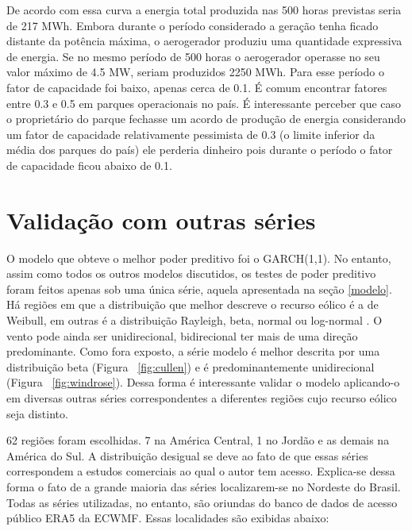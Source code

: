 \documentclass[
	12pt,				%
	openright,			%
	oneside,			%
	a4paper,			%
	english,			%
	french,				%
	spanish,			%
	brazil				%
	]{abntex2}
\begin{document}
De acordo com essa curva a energia total produzida nas 500 horas previstas seria de 217 MWh. Embora durante o período considerado a geração tenha ficado distante da potência máxima, o aerogerador produziu uma quantidade expressiva de energia. Se no mesmo período de 500 horas o aerogerador operasse no seu valor máximo de 4.5 MW, seriam produzidos 2250 MWh. Para esse período o fator de capacidade foi baixo, apenas cerca de 0.1. É comum encontrar fatores entre 0.3 e 0.5 em parques operacionais no país. É interessante perceber que caso o proprietário do parque fechasse um acordo de produção de energia considerando um fator de capacidade relativamente pessimista de 0.3 (o limite inferior da média dos parques do país) ele perderia dinheiro pois durante o período o fator de capacidade ficou abaixo de 0.1.

\chapter{Validação com outras séries}

O modelo que obteve o melhor poder preditivo foi o GARCH(1,1). No entanto, assim como todos os outros modelos discutidos, os testes  de poder preditivo foram feitos apenas sob uma única série, aquela apresentada na seção \ref{modelo}. Há regiões em que a distribuição que melhor descreve o recurso eólico é  a de Weibull, em outras é a distribuição Rayleigh, beta, normal ou log-normal \cite{dists}. O vento pode ainda ser unidirecional, bidirecional ter mais de uma direção predominante. Como fora exposto, a série modelo é melhor descrita por uma distribuição beta (Figura ~\ref{fig:cullen}) e é predominantemente unidirecional (Figura ~\ref{fig:windrose}). Dessa forma é interessante validar o modelo aplicando-o em diversas outras séries correspondentes a diferentes regiões cujo recurso eólico seja distinto. 

62 regiões foram escolhidas. 7 na América Central, 1 no Jordão e as demais na América do Sul. A distribuição desigual se deve ao fato de que essas séries correspondem a estudos comerciais ao qual o autor tem acesso. Explica-se dessa forma o fato de a grande maioria das séries localizarem-se no Nordeste do Brasil. Todas as séries utilizadas, no entanto, são oriundas do banco de dados de acesso público ERA5 da ECWMF. Essas localidades são exibidas abaixo:
\end{document}
